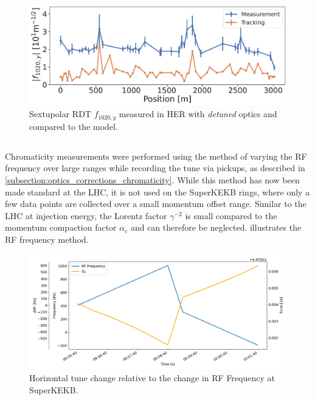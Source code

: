 \begin{figure}[!htb]
    \centering
    \includegraphics[width=0.8\linewidth]{images/kek/f1020y_HER.pdf}
    \caption{Sextupolar RDT $f_{1020,y}$ measured in HER with \textit{detuned} optics and compared to 
    the model.}
    \label{fig:kek:rdt_f1020y_HER}
\end{figure}



\FloatBarrier
\subsection{}

Chromaticity measurements were performed using the method of varying the RF frequency over large
ranges while recording the tune via pickups, as described in
\cref{subsection:optics_corrections_chromaticity}. While this method has now been made standard at
the LHC, it is not used on the SuperKEKB rings, where only a few data points are collected over a
small momentum offset range.
Similar to the LHC at injection energy, the Lorentz factor $\gamma^{-2}$ is small compared to the
momentum compaction factor $\alpha_c$ and can therefore be neglected.
 illustrates the RF frequency method.

\begin{figure}[!htb]
    \centering
    \includegraphics[width=0.8\linewidth]{images/kek/rf_qx.png}
    \caption{Horizontal tune change relative to the change in RF Frequency at SuperKEKB.}
    \label{fig:kek:chroma_procedure}
\end{figure}

